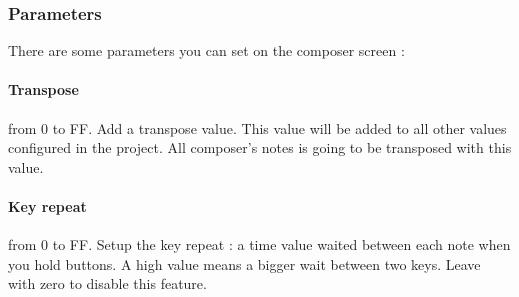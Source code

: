\subsubsection{Parameters}

There are some parameters you can set on the composer screen :


\paragraph{Transpose} from 0 to FF.
Add a transpose value. This value will be added to all other values configured in the project.
All composer's notes is going to be transposed with this value.

\paragraph{Key repeat} from 0 to FF.
Setup the key repeat : a time value waited between each note when you hold buttons.
A high value means a bigger wait between two keys. Leave with zero to disable this feature.
